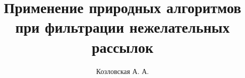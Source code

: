 \documentclass[12pt,a4paper,oneside,final]{report}
\author{Козловская А. А.}
\title{Применение природных алгоритмов при фильтрации нежелательных рассылок}
\newcommand{\pwd}{src/uir.nir}
\begin{document}
\maketitle
\setcounter{page}{2}

\clearpage


\clearpage
\tableofcontents{}

\clearpage


\clearpage


\clearpage


% 

\clearpage


\clearpage


\clearpage

\appendixtocon
\appendix
\renewcommand\thechapter{\Asbuk{chapter}}

\end{document}
